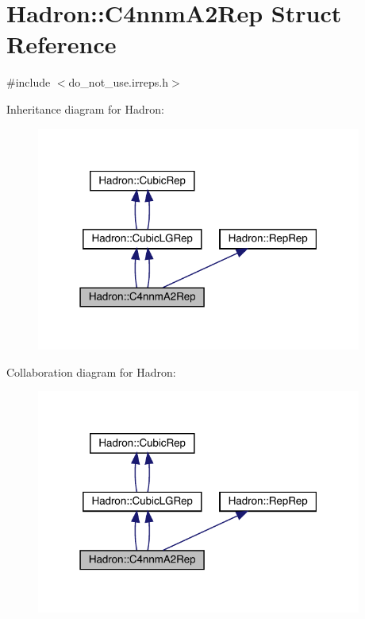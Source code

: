 \hypertarget{structHadron_1_1C4nnmA2Rep}{}\section{Hadron\+:\+:C4nnm\+A2\+Rep Struct Reference}
\label{structHadron_1_1C4nnmA2Rep}


{\ttfamily \#include $<$do\+\_\+not\+\_\+use.\+irreps.\+h$>$}



Inheritance diagram for Hadron\+:\nopagebreak
\begin{figure}[H]
\begin{center}
\leavevmode
\includegraphics[width=303pt]{d2/d33/structHadron_1_1C4nnmA2Rep__inherit__graph}
\end{center}
\end{figure}


Collaboration diagram for Hadron\+:\nopagebreak
\begin{figure}[H]
\begin{center}
\leavevmode
\includegraphics[width=303pt]{da/d77/structHadron_1_1C4nnmA2Rep__coll__graph}
\end{center}
\end{figure}
